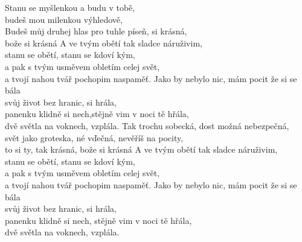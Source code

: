 \ve
{}Stanu se myšlenkou a budu v tobě,\\
budeš mou milenkou výhledově,\\
Budeš můj druhej hlas pro tuhle píseň, si krásná,\\
bože si krásná
\ve
A ve tvým obětí tak sladce náruživim,\\
stanu se obětí, stanu se kdoví kým,\\
a pak s tvým usměvem obletím celej svět,\\
a tvojí nahou tvář pochopim naspaměť.
\cho
{}Jako by nebylo nic, mám pocit že si se bála\\
svůj život bez hranic, si hrála,\\
panenku klidně si nech,stějně vim v noci tě hřála,\\
dvě světla na voknech, vzplála.
\ve
Tak trochu sobecká, dost možná nebezpečná,\\
svět jako groteska, né vďečná, nevěříš na pocity,\\
to si ty, tak krásná, bože si krásná
\ve
A ve tvým obětí tak sladce náruživim,\\
stanu se obětí, stanu se kdoví kým,\\
a pak s tvým usměvem obletím celej svět,\\
a tvojí nahou tvář pochopim naspaměť.
Jako by nebylo nic, mám pocit že si se bála\\
svůj život bez hranic, si hrála,\\
panenku klidně si nech, stějně vim v noci tě hřála,\\
dvě světla na voknech, vzplála.
\esong

